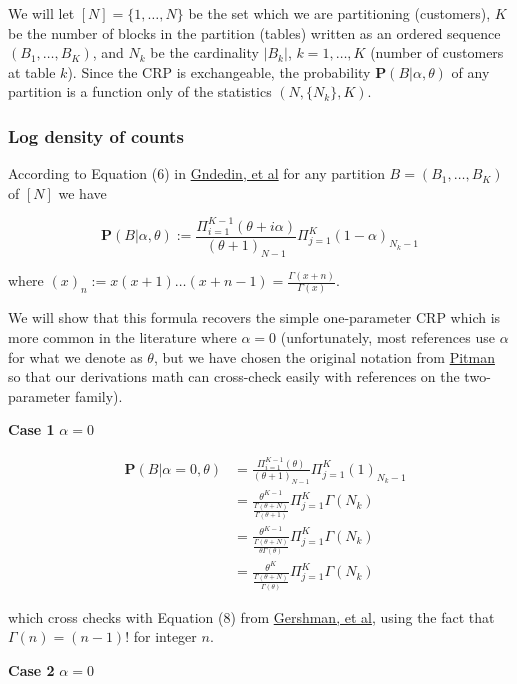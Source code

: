 \documentclass[12pt]{article}
\begin{document}
We will let $[N] = \{1,\dots,N\}$ be the set which we are partitioning (customers),
$K$ be the number of blocks in the partition (tables) written as an ordered sequence
$(B_1,\dots,B_K)$, and $N_k$ be the cardinality $|B_k|$, $k = 1,\dots,K$
(number of customers at table $k$). Since the CRP is exchangeable, the probability
$\mathbf{P}(B|\alpha,\theta)$ of any partition is a function only of the statistics
$(N,\{N_k\},K)$.

\subsubsection{Log density of counts}

According to Equation (6) in
\href{http://arxiv.org/pdf/0909.3642.pdf}{Gndedin, et al}
for any partition $B=(B_1,\dots,B_K)$ of $[N]$ we have

\[
\mathbf{P}(B|\alpha,\theta)
:= \frac{\Pi_{i=1}^{K-1}(\theta+i\alpha)}{(\theta+1)_{N-1}}\Pi_{j=1}^K(1-\alpha)_{N_k-1}
\]

where $(x)_n := x(x+1)\dots(x+n-1) = \frac{\Gamma(x+n)}{\Gamma(x)}$.

We will show that this formula recovers the simple one-parameter CRP which is more
common in the literature where $\alpha = 0$ (unfortunately, most references use
$\alpha$ for what we denote as $\theta$, but we have chosen the original notation from
\href{http://link.springer.com/article/10.1007/BF01213386}{Pitman} so that our
derivations math can cross-check easily with references on the two-parameter family).

\textbf{Case 1} $\alpha = 0$

\begin{eqnarray*}
&\mathbf{P}(B|\alpha=0,\theta)
    & = \frac{\Pi_{i=1}^{K-1}(\theta)}{(\theta+1)_{N-1}}\Pi_{j=1}^K(1)_{N_k-1}\\
&   & = \frac{\theta^{K-1}}{\frac{\Gamma(\theta+N)}{\Gamma(\theta+1)}}\Pi_{j=1}^K\Gamma(N_k)\\
&   & = \frac{\theta^{K-1}}{\frac{\Gamma(\theta+N)}{\theta\Gamma(\theta)}}\Pi_{j=1}^K\Gamma(N_k)\\
&   & = \frac{\theta^{K}}{\frac{\Gamma(\theta+N)}{\Gamma(\theta)}}\Pi_{j=1}^K\Gamma(N_k)
\end{eqnarray*}

which cross checks with Equation (8) from
\href{http://web.mit.edu/sjgershm/www/GershmanBlei12.pdf#page=4}{Gershman, et al},
using the fact that $\Gamma(n) = (n-1)!$ for integer $n$.

\textbf{Case 2} $\alpha = 0$
\end{document}

